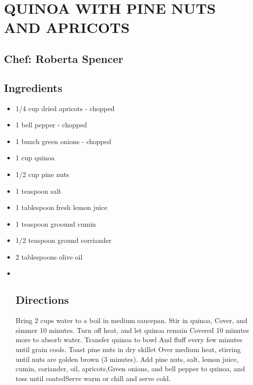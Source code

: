 \documentclass[
]{book}
\begin{document}
\hypertarget{quinoa-with-pine-nuts-and-apricots}{%
\section*{QUINOA WITH PINE NUTS AND APRICOTS}\label{quinoa-with-pine-nuts-and-apricots}}


\hypertarget{chef-roberta-spencer-9}{%
\subsection*{Chef: Roberta Spencer}\label{chef-roberta-spencer-9}}


\hypertarget{ingredients-35}{%
\subsection*{Ingredients}\label{ingredients-35}}


\begin{itemize}
\item
  1/4 cup dried apricots - chopped
\item
  1 bell pepper - chopped
\item
  1 bunch green onions - chopped
\item
  1 cup quinoa
\item
  1/2 cup pine nuts
\item
  1 teaspoon salt
\item
  1 tablespoon fresh lemon juice
\item
  1 teaspoon groound cumin
\item
  1/2 teaspoon ground corriander
\item
  2 tablespoons olive oil
\item ~
  \hypertarget{directions-35}{%
  \subsection*{Directions}\label{directions-35}}

  Bring 2 cups water to a boil in medium saucepan. Stir in quinoa, Cover, and simmer 10 minutes. Turn off heat, and let quinoa remain Covered 10 minutes more to absorb water. Transfer quinoa to bowl And fluff every few minutes until grain cools. Toast pine nuts in dry skillet Over medium heat, stirring until nuts are golden brown (3 minutes). Add pine nuts, salt, lemon juice, cumin, coriander, oil, apricots,Green onions, and bell pepper to quinoa, and toss until coatedServe warm or chill and serve cold.
\end{itemize}
\end{document}
